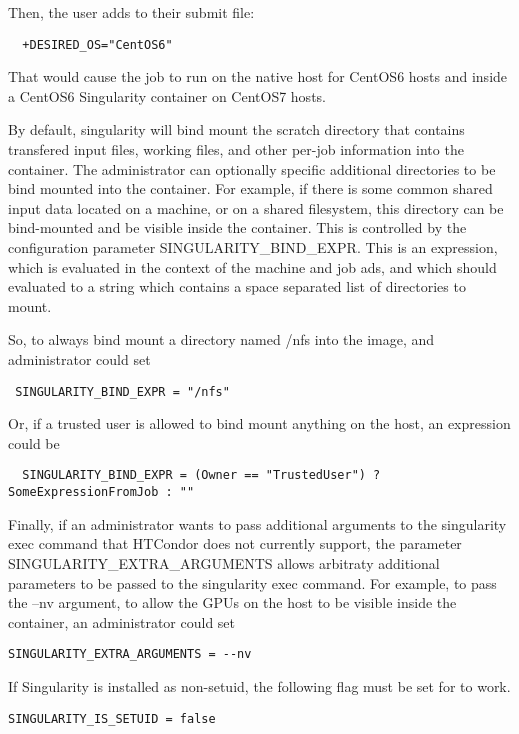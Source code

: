 Then, the user adds to their submit file:

\begin{verbatim}
  +DESIRED_OS="CentOS6"
\end{verbatim}

That would cause the job to run on the native host for CentOS6 hosts
and inside a CentOS6 Singularity container on CentOS7 hosts.

By default, singularity will bind mount the scratch directory that contains transfered input files, 
working files, and other per-job information into the container.  The administrator can optionally
specific additional directories to be bind mounted into the container.  For example, if there is some common
shared input data located on a machine, or on a shared filesystem, this directory can be bind-mounted 
and be visible inside the container.  This is controlled by the configuration parameter
SINGULARITY\_BIND\_EXPR.  This is an expression, which is evaluated in the context of the machine and job ads,
and which should evaluated to a string which contains a space separated list of directories to mount.

So, to always bind mount a directory named /nfs into the image, and administrator could set
\begin{verbatim}
 SINGULARITY_BIND_EXPR = "/nfs"
\end{verbatim}

Or, if a trusted user is allowed to bind mount anything on the host, an expression could be
\begin{verbatim}
  SINGULARITY_BIND_EXPR = (Owner == "TrustedUser") ? SomeExpressionFromJob : ""
\end{verbatim}

Finally, if an administrator wants to pass additional arguments to the singularity exec command that HTCondor
does not currently support, the parameter SINGULARITY\_EXTRA\_ARGUMENTS allows arbitraty additional parameters
to be passed to the singularity exec command.  For example, to pass the --nv argument, to allow the GPUs on the
host to be visible inside the container, an administrator could set

\begin{verbatim}
SINGULARITY_EXTRA_ARGUMENTS = --nv
\end{verbatim}

If Singularity is installed as non-setuid, the following flag must be set
for  to work.

\begin{verbatim}
SINGULARITY_IS_SETUID = false
\end{verbatim}

